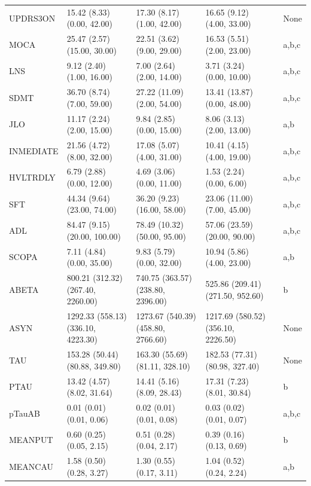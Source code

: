 \documentclass[1pt]{article}
\begin{document}
\begin{landscape}
\begin{tabular}{llllll}
	UPDRS3ON &         15.42 (8.33) (0.00, 42.00) &         17.30 (8.17) (1.00, 42.00) &         16.65 (9.12) (4.00, 33.00) &         &     None \\
	MOCA &        25.47 (2.57) (15.00, 30.00) &         22.51 (3.62) (9.00, 29.00) &         16.53 (5.51) (2.00, 23.00) &         &    a,b,c \\
	LNS &          9.12 (2.40) (1.00, 16.00) &          7.00 (2.64) (2.00, 14.00) &          3.71 (3.24) (0.00, 10.00) &         &    a,b,c \\
	SDMT &         36.70 (8.74) (7.00, 59.00) &        27.22 (11.09) (2.00, 54.00) &        13.41 (13.87) (0.00, 48.00) &         &    a,b,c \\
	JLO &         11.17 (2.24) (2.00, 15.00) &          9.84 (2.85) (0.00, 15.00) &          8.06 (3.13) (2.00, 13.00) &         &      a,b \\
	INMEDIATE &         21.56 (4.72) (8.00, 32.00) &         17.08 (5.07) (4.00, 31.00) &         10.41 (4.15) (4.00, 19.00) &         &    a,b,c \\
	HVLTRDLY &          6.79 (2.88) (0.00, 12.00) &          4.69 (3.06) (0.00, 11.00) &           1.53 (2.24) (0.00, 6.00) &         &    a,b,c \\
	SFT &        44.34 (9.64) (23.00, 74.00) &        36.20 (9.23) (16.00, 58.00) &        23.06 (11.00) (7.00, 45.00) &         &    a,b,c \\
	ADL &       84.47 (9.15) (20.00, 100.00) &       78.49 (10.32) (50.00, 95.00) &       57.06 (23.59) (20.00, 90.00) &         &    a,b,c \\
	SCOPA &          7.11 (4.84) (0.00, 35.00) &          9.83 (5.79) (0.00, 32.00) &         10.94 (5.86) (4.00, 23.00) &         &      a,b \\
	ABETA &  800.21 (312.32) (267.40, 2260.00) &  740.75 (363.57) (238.80, 2396.00) &   525.86 (209.41) (271.50, 952.60) &         &        b \\
	ASYN & 1292.33 (558.13) (336.10, 4223.30) & 1273.67 (540.39) (458.80, 2766.60) & 1217.69 (580.52) (356.10, 2226.50) &         &     None \\
	TAU &     153.28 (50.44) (80.88, 349.80) &     163.30 (55.69) (81.11, 328.10) &     182.53 (77.31) (80.98, 327.40) &         &     None \\
	PTAU &         13.42 (4.57) (8.02, 31.64) &         14.41 (5.16) (8.09, 28.43) &         17.31 (7.23) (8.01, 30.84) &         &        b \\
	pTauAB &           0.01 (0.01) (0.01, 0.06) &           0.02 (0.01) (0.01, 0.08) &           0.03 (0.02) (0.01, 0.07) &         &    a,b,c \\
	MEANPUT &           0.60 (0.25) (0.05, 2.15) &           0.51 (0.28) (0.04, 2.17) &           0.39 (0.16) (0.13, 0.69) &         &        b \\
	MEANCAU &           1.58 (0.50) (0.28, 3.27) &           1.30 (0.55) (0.17, 3.11) &           1.04 (0.52) (0.24, 2.24) &         &      a,b \\
	\bottomrule
\end{tabular}



\end{landscape}
\end{document}

